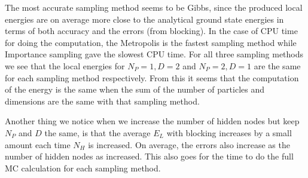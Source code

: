 \documentclass[12pt,a4paper,english]{article}
\begin{document}
The most accurate sampling method seems to be Gibbs, since the produced local energies are on average more close to the analytical ground state energies in terms of both accuracy and the errors (from blocking). In the case of CPU time for doing the computation, the Metropolis is the fastest sampling method while Importance sampling gave the slowest CPU time. For all three sampling methods we see that the local energies for $N_P=1,D=2$ and $N_P=2,D=1$ are the same for each sampling method respectively. From this it seems that the computation of the energy is the same when the sum of the number of particles and dimensions are the same with that sampling method.

Another thing we notice when we increase the number of hidden nodes but keep $N_P$ and $D$ the same, is that the average $E_L$ with blocking increases by a small amount each time $N_H$ is increased. On average, the errors also increase as the number of hidden nodes as increased. This also goes for the time to do the full MC calculation for each sampling method. 
\end{document}
